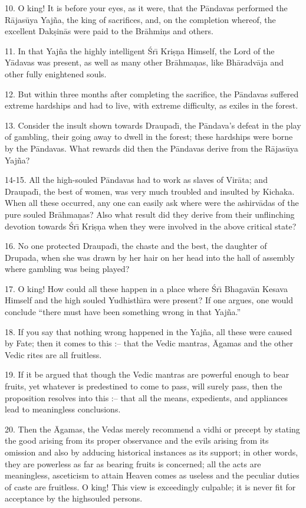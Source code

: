 10. O king! It is before your eyes, as it were, that the P\=andavas performed the R\=ajas\=uya Yaj\~na, the king of sacrifices, and, on the completion whereof, the excellent Dak\d{s}in\=as were paid to the Br\=ahmi\d{n}s and others.

11. In that Yaj\~na the highly intelligent \'Sr\={\i} Kri\d{s}\d{n}a Himself, the Lord of the Y\=adavas was present, as well as many other Br\=ahma\d{n}as, like Bh\=aradv\=aja and other fully enightened souls.

12. But within three months after completing the sacrifice, the P\=andavas suffered extreme hardships and had to live, with extreme difficulty, as exiles in the forest.

13. Consider the insult shown towards Draupad\={\i}, the P\=andava's defeat in the play of gambling, their going away to dwell in the forest; these hardships were borne by the P\=andavas. What rewards did then the P\=andavas derive from the R\=ajas\=uya Yaj\~na?

14-15. All the high-souled P\=andavas had to work as slaves of Vir\=ata; and Draupad\={\i}, the best of women, was very much troubled and insulted by Kichaka. When all these occurred, any one can easily ask where were the ashirv\=adas of the pure souled Br\=ahma\d{n}as? Also what result did they derive from their unflinching devotion towards \'Sr\={\i} Kri\d{s}\d{n}a when they were involved in the above critical state?

16. No one protected Draupad\={\i}, the chaste and the best, the daughter of Drupada, when she was drawn by her hair on her head into the hall of assembly where gambling was being played?

17. O king! How could all these happen in a place where \'Sr\={\i} Bhagav\=an Kesava Himself and the high souled Yudhisth\={\i}ra were present? If one argues, one would conclude ``there must have been something wrong in that Yaj\~na.''

18. If you say that nothing wrong happened in the Yaj\~na, all these were caused by Fate; then it comes to this :-- that the Vedic mantras, \=Agamas and the other Vedic rites are all fruitless.

19. If it be argued that though the Vedic mantras are powerful enough to bear fruits, yet whatever is predestined to come to pass, will surely pass, then the proposition resolves into this :-- that all the means, expedients, and appliances lead to meaningless conclusions.

20. Then the \=Agamas, the Vedas merely recommend a vidhi or precept by stating the good arising from its proper observance and the evils arising from its omission and also by adducing historical instances as its support; in other words, they are powerless as far as bearing fruits is concerned; all the acts are meaningless, asceticism to attain Heaven comes as useless and the peculiar duties of caste are fruitless. O king! This view is exceedingly culpable; it is never fit for acceptance by the highsouled persons.

